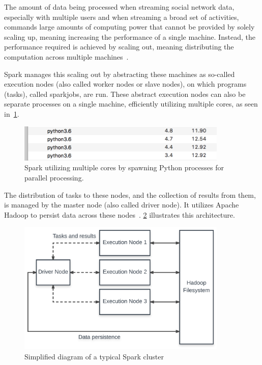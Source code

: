 The amount of data being processed when streaming social network data,
especially with multiple users and when streaming a broad set of activities,
commands large amounts of computing power that cannot be provided by solely scaling up,
meaning increasing the performance of a single machine.
Instead, the performance required is achieved by scaling out,
meaning distributing the computation across multiple machines~\cite{Wolke2010}.
\par %
Spark manages this scaling out by abstracting these machines as so-called execution nodes (also called worker nodes or slave nodes),
on which programs (tasks), called sparkjobs, are run.
These abstract execution nodes can also be separate processes on a single machine,
efficiently utilizing multiple cores, as seen in~\ref{fig:spark_processes}.

\begin{figure}
    \centering
    \caption{Spark utilizing multiple cores by spawning Python processes for parallel processing.}
    \label{fig:spark_processes}
    \includegraphics[width=10cm]{../images/python_processes.png}
\end{figure}

The distribution of tasks to these nodes, and the collection of results from them,
is managed by the master node (also called driver node).
It utilizes Apache Hadoop to persist data across these nodes~\cite{Zaharia2016}.
\ref{fig:spark} illustrates this architecture.

\begin{figure}
    \centering
    \caption{Simplified diagram of a typical Spark cluster}
    \label{fig:spark}
    \includegraphics[width=10cm]{../figures/spark.pdf}
\end{figure}

